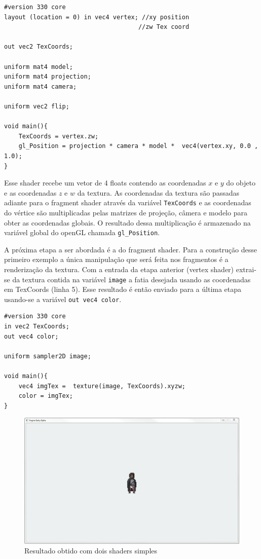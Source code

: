 \documentclass[12pt, 
openright, 
oneside, 
a4paper,    
brazil]{facom-ufu-abntex2}
\begin{document}
 \begin{lstlisting}[caption=Vertex shader simples]
#version 330 core
layout (location = 0) in vec4 vertex; //xy position
									 //zw Tex coord

out vec2 TexCoords;

uniform mat4 model;
uniform mat4 projection;
uniform mat4 camera;

uniform vec2 flip;

void main(){
	TexCoords = vertex.zw;
	gl_Position = projection * camera * model *  vec4(vertex.xy, 0.0 , 1.0);
}
\end{lstlisting}

Esse shader recebe um vetor de 4 floats contendo as coordenadas $x$ e $y$ do objeto e as coordenadas $z$ e $w$ da textura. As coordenadas da textura são passadas adiante para o fragment shader através da variável \texttt{TexCoords} e as coordenadas do vértice são multiplicadas pelas matrizes de projeção, câmera e modelo para obter as coordenadas globais. O resultado dessa multiplicação é armazenado na variável global do openGL chamada \texttt{gl_Position}.

A próxima etapa a ser abordada é a do fragment shader. Para a construção desse primeiro exemplo a única manipulação que será feita nos fragmentos é a renderização da textura. Com a entrada da etapa anterior (vertex shader) extrai-se da textura contida na variável \texttt{image} a fatia desejada usando as coordenadas em TexCoords (linha 5). Esse resultado é então enviado para a última etapa usando-se a variável \texttt{out vec4 color}.

 \begin{lstlisting}[caption=Fragment shader simples]
#version 330 core
in vec2 TexCoords;
out vec4 color;

uniform sampler2D image;

void main(){
	vec4 imgTex =  texture(image, TexCoords).xyzw;
	color = imgTex;
}
\end{lstlisting}

\begin{figure}[H]
	\centering
	\includegraphics[width=\textwidth]{imagens/helloShader.png}
	\caption{Resultado obtido com dois shaders simples}
\end{figure}
\end{document}
